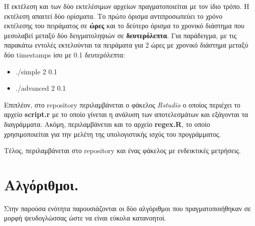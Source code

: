 \documentclass[12pt, a4paper]{article}
\begin{document}
\justify
Η εκτέλεση και των δύο εκτελέσιμων αρχείων πραγματοποιείται με τον ίδιο τρόπο. Η εκτέλεση απαιτεί δύο ορίσματα. Το πρώτο όρισμα αντιπροσωπεύει το χρόνο εκτέλεσης του πειράματος σε \textbf{ώρες} και το δεύτερο όρισμα το χρονικό διάστημα που μεσολαβεί μεταξύ δύο δειγματοληψιών σε \textbf{δευτερόλεπτα}. Για παράδειγμα, με τις παρακάτω εντολές εκτελούνται τα πειράματα για 2 ώρες με χρονικό διάστημα μεταξύ δύο \textlatin{timestamps} ίσο με 0.1 δευτερόλεπτα:
\begin{itemize}
  \item \textlatin{./simple 2 0.1}
  \item \textlatin{./advanced 2 0.1}
\end{itemize}

\justify
Επιπλέον, στο \textlatin{repository} περιλαμβάνεται ο φάκελος \textit{\textlatin{Rstudio}} ο οποίος περιέχει το αρχείο \textlatin{\textbf{script.r}} με το οποίο γίνεται η ανάλυση των αποτελεσμάτων και εξάγονται τα διαγράμματα. Ακόμη, περιλαμβάνεται και το αρχείο \textlatin{\textbf{regex.R}}, το οποίο χρησιμοποιείται για την μελέτη της υπολογιστικής ισχύς του προγράμματος.

\justify
Τέλος, περιλαμβάνεται στο repository και ένας φάκελος με ενδεικτικές μετρήσεις.

\section{Αλγόριθμοι.}
Στην παρούσα ενότητα παρουσιάζονται οι δύο αλγόριθμοι που πραγματοποιήθηκαν σε μορφή ψευδογλώσσας ώστε να είναι εύκολα κατανοητοί.
\end{document}

